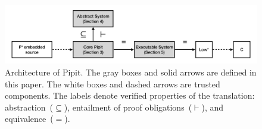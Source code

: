 \begin{figure}
  \includegraphics[width=\textwidth]{figures/core-structure-1920x450.pdf}
\caption{Architecture of Pipit. The gray boxes and solid arrows are defined in this paper. The white boxes and dashed arrows are trusted components. The labels denote verified properties of the translation: abstraction~($\subseteq$), entailment of proof obligations~($\vdash$), and equivalence~($=$).
}
\label{f:core:structure}
\end{figure}
